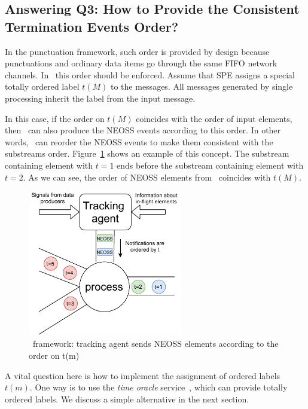 \subsection*{Answering Q3: How to Provide the Consistent Termination Events Order?}
\label{termination_order}
In the punctuation framework, such order is provided by design because punctuations and ordinary data items go through the same FIFO network channels. In \tracker\, this order should be enforced. Assume that SPE assigns a special totally ordered label $t(M)$ to the messages. All messages generated by single processing inherit the label from the input message. 

In this case, if the order on $t(M)$ coincides with the order of input elements, then \tracker\ can also produce the NEOSS events according to this order. In other words, \tracker\ can reorder the NEOSS events to make them consistent with the substreams order. Figure~\ref{tracker_ordering} shows an example of this concept. The substream containing element with $t=1$ ends before the substream containing element with $t=2$. As we can see, the order of NEOSS elements from \tracker\ coincides with $t(M)$.

\begin{figure}[t]
  \centering
  \includegraphics[width=0.60\textwidth]{Chapters/Tracker/pics/tracker-ordering.pdf}
  \caption{\tracker\ framework: tracking agent sends NEOSS elements according to the order on t(m)}
  \label{tracker_ordering}
\end{figure}

A vital question here is how to implement the assignment of ordered labels $t(m)$. One way is to use the {\em time oracle} service~\cite{10.14778/3055330.3055335}, which can provide totally ordered labels. We discuss a simple alternative in the next section. 

